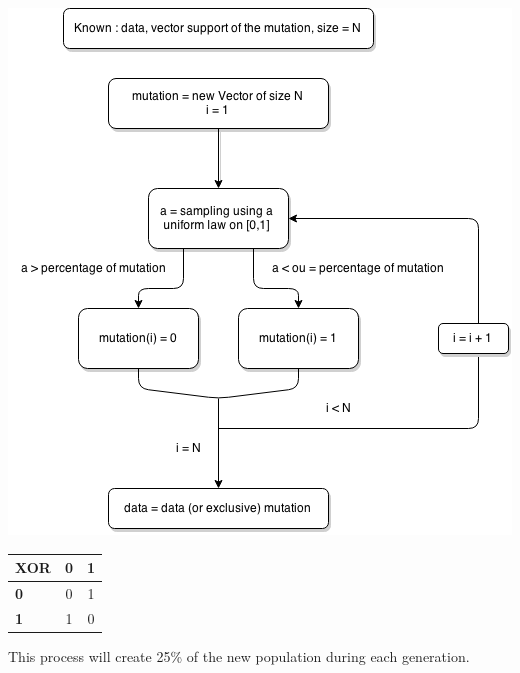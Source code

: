 \documentclass{report}
\begin{document}
	\vspace{1cm}
	\begin{center}
		\includegraphics[scale=0.65]{ressources/ag2}
	\end{center}
	\newpage
	
	\begin{center}
		\begin{tabular}{|l|c|c|}
			\hline \textbf{XOR} & \textbf{0} & \textbf{1}\\
			\hline \textbf{0} & 0 & 1\\
			\hline \textbf{1} & 1 & 0\\
			\hline
		\end{tabular}
	\end{center}
	\vspace{0.5cm}
	
	This process will create 25\% of the new population during each generation.
	
\end{document}
